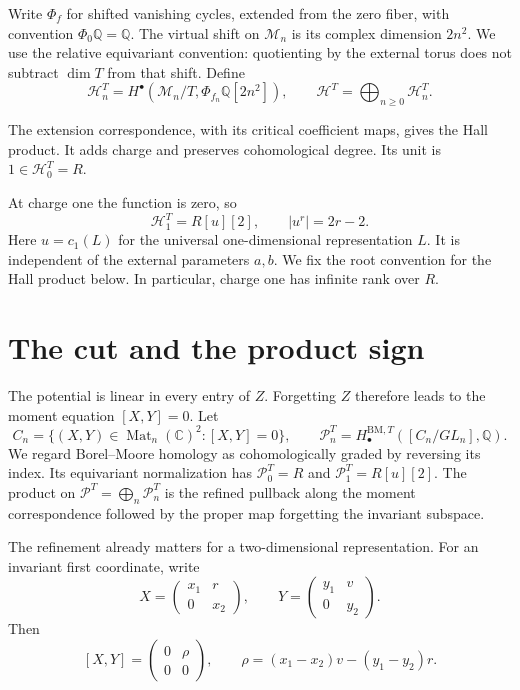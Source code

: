 Write $\Phi_f$ for shifted vanishing cycles, extended from the zero
fiber, with convention $\Phi_0\mathbb Q=\mathbb Q$. The virtual
shift on $\mathcal M_n$ is its complex dimension $2n^2$. We use the
relative equivariant convention: quotienting by the external torus
does not subtract $\dim T$ from that shift. Define
\begin{equation}\label{cylocal:eq:critical-hall}
 \mathcal H_n^T=
 H^\bullet(\mathcal M_n/T,\Phi_{f_n}\mathbb Q[2n^2]),
 \qquad \mathcal H^T=\bigoplus_{n\geq0}\mathcal H_n^T.
\end{equation}

The extension correspondence, with its critical coefficient maps,
gives the Hall product. It adds charge and preserves cohomological
degree. Its unit is $1\in\mathcal H_0^T=R$.

At charge one the function is zero, so
\begin{equation}\label{cylocal:eq:charge-one}
 \mathcal H_1^T=R[u][2],\qquad |u^r|=2r-2.
\end{equation}
Here $u=c_1(L)$ for the universal one-dimensional representation $L$.
It is independent of the external parameters $a,b$.
We fix the root convention for the Hall product below.
In particular, charge one has infinite rank over $R$.

\section{The cut and the product sign}
\label{cylocal:sec:cut}

The potential is linear in every entry of $Z$. Forgetting $Z$
therefore leads to the moment equation $[X,Y]=0$. Let
\[
 C_n=\{(X,Y)\in\operatorname{Mat}_n(\mathbb C)^2:[X,Y]=0\},
 \qquad \mathcal P_n^T=H^{\mathrm{BM},T}_\bullet([C_n/GL_n],\mathbb Q).
\]
We regard Borel--Moore homology as cohomologically graded by reversing
its index. Its equivariant normalization has
$\mathcal P_0^T=R$ and $\mathcal P_1^T=R[u][2]$.
The product on $\mathcal P^T=\bigoplus_n\mathcal P_n^T$ is the
refined pullback along the moment correspondence followed by the
proper map forgetting the invariant subspace.

The refinement already matters for a two-dimensional representation.
For an invariant first coordinate, write
\[
 X=\begin{pmatrix}x_1&r\\0&x_2\end{pmatrix},\qquad
 Y=\begin{pmatrix}y_1&v\\0&y_2\end{pmatrix}.
\]
Then
\begin{equation}\label{cylocal:eq:residual}
 [X,Y]=\begin{pmatrix}0&\rho\\0&0\end{pmatrix},
 \qquad \rho=(x_1-x_2)v-(y_1-y_2)r.
\end{equation}

